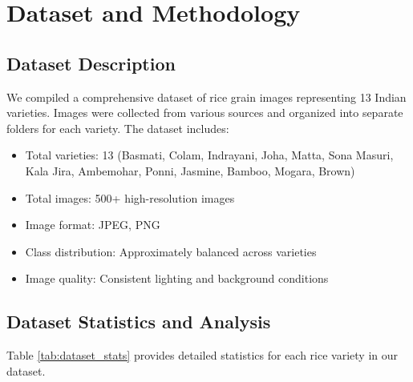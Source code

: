 \documentclass[conference]{IEEEtran}
\begin{document}
\section{Dataset and Methodology}

\subsection{Dataset Description}

We compiled a comprehensive dataset of rice grain images representing 13 Indian varieties. Images were collected from various sources and organized into separate folders for each variety. The dataset includes:

\begin{itemize}
    \item Total varieties: 13 (Basmati, Colam, Indrayani, Joha, Matta, Sona Masuri, Kala Jira, Ambemohar, Ponni, Jasmine, Bamboo, Mogara, Brown)
    \item Total images: 500+ high-resolution images
    \item Image format: JPEG, PNG
    \item Class distribution: Approximately balanced across varieties
    \item Image quality: Consistent lighting and background conditions
\end{itemize}

\subsection{Dataset Statistics and Analysis}

Table \ref{tab:dataset_stats} provides detailed statistics for each rice variety in our dataset.

\begin{table}[H]
\caption{Dataset Statistics by Rice Variety}
\centering
\small
{}
\label{tab:dataset_stats}
\end{table}
\end{document}
